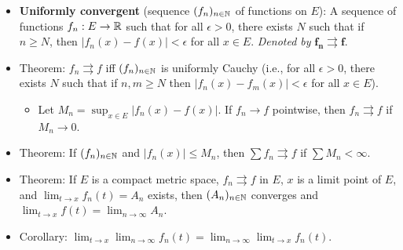\documentclass[../../notes.tex]{subfiles}
\begin{document}
\begin{itemize}
    \item \textbf{Uniformly convergent} (sequence $(f_n)_{n\in\mathbb{N}}$ of functions on $E$): A sequence of functions $f_n:E\to\mathbb{R}$ such that for all $\epsilon>0$, there exists $N$ such that if $n\geq N$, then $|f_n(x)-f(x)|<\epsilon$ for all $x\in E$. \emph{Denoted by} $\bm{f_n\rightrightarrows f}$.
    \item Theorem: $f_n\rightrightarrows f$ iff $(f_n)_{n\in\mathbb{N}}$ is uniformly Cauchy (i.e., for all $\epsilon>0$, there exists $N$ such that if $n,m\geq N$ then $|f_n(x)-f_m(x)|<\epsilon$ for all $x\in E$).
    \begin{itemize}
        \item Let $M_n=\sup_{x\in E}|f_n(x)-f(x)|$. If $f_n\to f$ pointwise, then $f_n\rightrightarrows f$ if $M_n\to 0$.
    \end{itemize}
    \item Theorem: If $(f_n)_{n\in\mathbb{N}}$ and $|f_n(x)|\leq M_n$, then $\sum f_n\rightrightarrows f$ if $\sum M_n<\infty$.
    \item Theorem: If $E$ is a compact metric space, $f_n\rightrightarrows f$ in $E$, $x$ is a limit point of $E$, and $\lim_{t\to x}f_n(t)=A_n$ exists, then $(A_n)_{n\in\mathbb{N}}$ converges and $\lim_{t\to x}f(t)=\lim_{n\to\infty}A_n$.
    \item Corollary: $\lim_{t\to x}\lim_{n\to\infty}f_n(t)=\lim_{n\to\infty}\lim_{t\to x}f_n(t)$.
\end{itemize}
\end{document}

